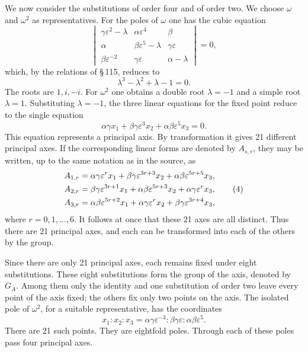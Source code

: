 \documentclass[11pt]{article}
\providecommand{\eps}{\varepsilon}
\providecommand{\eps}{\varepsilon}
\begin{document}
We now consider the substitutions of order four and of order two. We choose \(\omega\) and \(\omega^2\) as representatives. For the poles of \(\omega\) one has the cubic equation
\begin{equation}
\begin{vmatrix}
\gamma\eps^2-\lambda&\alpha\eps^4&\beta\\
\alpha&\beta\eps^5-\lambda&\gamma\eps\\
\beta\eps^{-2}&\gamma\eps&\alpha-\lambda
\end{vmatrix}=0,
\tag{1}
\end{equation}
which, by the relations of \S\,115, reduces to
\begin{equation}
\lambda^3-\lambda^2+\lambda-1=0.
\tag{2}
\end{equation}
The roots are \(1,i,-i\). For \(\omega^2\) one obtains a double root \(\lambda=-1\) and a simple root \(\lambda=1\). Substituting \(\lambda=-1\), the three linear equations for the fixed point reduce to the single equation
\begin{equation}
\alpha\gamma x_1+\beta\gamma\eps^3x_2+\alpha\beta\eps^5x_3=0.
\tag{3}
\end{equation}
This equation represents a principal axis. By transformation it gives 21 different principal axes. If the corresponding linear forms are denoted by \(A_{s,r}\), they may be written, up to the same notation as in the source, as
\begin{align}
A_{1,r}&=\alpha\gamma\eps^{r}x_1+\beta\gamma\eps^{3r+3}x_2+\alpha\beta\eps^{5r+5}x_3,\notag\\
A_{2,r}&=\beta\gamma\eps^{3r+1}x_1+\alpha\beta\eps^{5r+3}x_2+\alpha\gamma\eps^{r}x_3,\tag{4}\\
A_{3,r}&=\alpha\beta\eps^{5r+2}x_1+\alpha\gamma\eps^{r}x_2+\beta\gamma\eps^{3r+4}x_3,\notag
\end{align}
where \(r=0,1,\ldots,6\). It follows at once that these 21 axes are all distinct. Thus there are 21 principal axes, and each can be transformed into each of the others by the group.

Since there are only 21 principal axes, each remains fixed under eight substitutions. These eight substitutions form the group of the axis, denoted by \(G_A\). Among them only the identity and one substitution of order two leave every point of the axis fixed; the others fix only two points on the axis. The isolated pole of \(\omega^2\), for a suitable representative, has the coordinates
\begin{equation}
x_1:x_2:x_3=\alpha\gamma\eps^{-3}:\beta\gamma\eps:\alpha\beta\eps^5.
\tag{5}
\end{equation}
There are 21 such points. They are eightfold poles. Through each of these poles pass four principal axes.
\end{document}
